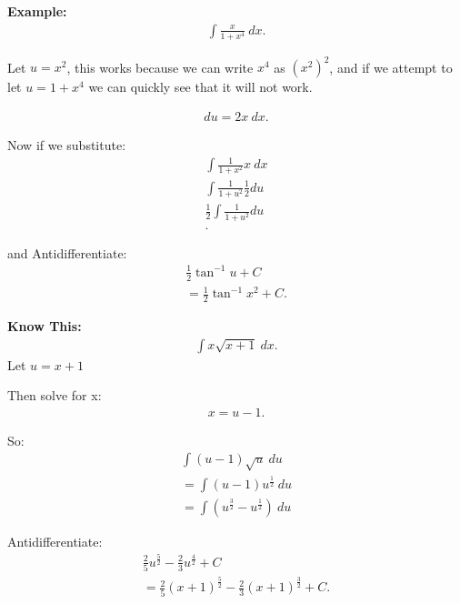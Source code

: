 \documentclass{report}
\begin{document}
  \bigbreak \noindent 
  \begin{mdframed}
    \textbf{Example: }
    \begin{align*}
      \int \frac{x}{1+x^{4}}\ dx
    .\end{align*}
  \end{mdframed}

  \bigbreak \noindent \bigbreak \noindent
  Let $u= x^{2}$, this works because we can write $x^{4}$ as $(x^{2})^{2}$, and if  we attempt to let $u=1+x^{4}$ we can quickly see that it will not work.

  \begin{align*}
    du = 2x\ dx
  .\end{align*}

  \bigbreak \noindent \bigbreak \noindent 
  Now if we substitute:
  \begin{align*}
    \int \frac{1}{1+x^{2}}x \ dx \\
     \int \frac{1}{1+u^{2}}\frac{1}{2}du \\
     \frac{1}{2}\int \frac{1}{1+u^{2}}du \\
  .\end{align*}
  \bigbreak \noindent \bigbreak \noindent 

  \bigbreak \noindent \bigbreak \noindent
  and Antidifferentiate:
  \begin{align*}
    \frac{1}{2}\tan^{-1}{u} + C \\
    \boxed{= \frac{1}{2}\tan^{-1}{x^{2}} + C }
  .\end{align*}

  \bigbreak \noindent \bigbreak \noindent
  \begin{mdframed}
    \textbf{Know This:}
      \begin{align*}
    \int x\sqrt{x+1}\ dx
  .\end{align*}
  \bigbreak \noindent \bigbreak \noindent
  Let $u=x+1$

  \bigbreak \noindent \bigbreak \noindent
  Then solve for x:
  \begin{align*}
    x = u-1
  .\end{align*}

  \bigbreak \noindent
  So:
  \begin{align*}
    \int (u-1)\sqrt{u}\ du \\
    = \int (u-1)u^{\frac{1}{2}}\ du \\
     = \int (u^{\frac{3}{2}} - u^{\frac{1}{2}})\ du
  \end{align*}

  \bigbreak \noindent \bigbreak \noindent
  Antidifferentiate:
  \begin{align*}
    \frac{2}{5}u^{\frac{5}{2}} - \frac{2}{3}u^{\frac{4}{2}} + C \\
    = \frac{2}{5}(x+1)^{\frac{5}{2}} - \frac{2}{3}(x+1)^{\frac{3}{2}} + C
  .\end{align*}
  \end{mdframed}
\end{document}
